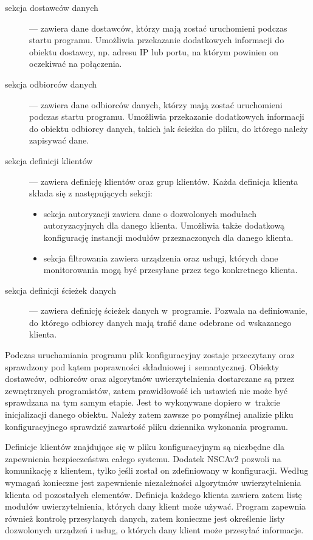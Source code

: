 \begin{description}
\item[sekcja dostawców danych] --- zawiera dane dostawców, którzy mają
  zostać uruchomieni podczas startu programu. Umożliwia przekazanie
  dodatkowych informacji do obiektu dostawcy, np. adresu IP lub portu,
  na którym powinien on oczekiwać na połączenia. 
\item[sekcja odbiorców danych] --- zawiera dane odbiorców danych, którzy
  mają zostać uruchomieni podczas startu programu. Umożliwia
  przekazanie dodatkowych informacji do obiektu odbiorcy danych,
  takich jak ścieżka do pliku, do którego należy zapisywać dane. 
\item[sekcja definicji klientów] --- zawiera definicję klientów oraz grup
  klientów. Każda definicja klienta składa się z następujących sekcji:
  \begin{itemize}
  \item sekcja autoryzacji zawiera dane o dozwolonych modułach
    autoryzacyjnych dla danego klienta. Umożliwia także dodatkową
    konfigurację instancji modułów przeznaczonych dla danego klienta.
  \item sekcja filtrowania zawiera urządzenia oraz usługi, których
    dane monitorowania mogą być przesyłane przez tego konkretnego
    klienta.
  \end{itemize}
\item[sekcja definicji ścieżek danych] --- zawiera definicję ścieżek
  danych w~programie. Pozwala na definiowanie, do którego odbiorcy
  danych mają trafić dane odebrane od wskazanego klienta.
\end{description}

Podczas uruchamiania programu plik konfiguracyjny zostaje przeczytany
oraz sprawdzony pod kątem poprawności składniowej
i~semantycznej. Obiekty dostawców, odbiorców oraz algorytmów
uwierzytelnienia dostarczane są przez zewnętrznych programistów, zatem
prawidłowość ich ustawień nie może być sprawdzana na tym samym
etapie. Jest to wykonywane dopiero w~trakcie inicjalizacji danego
obiektu. Należy zatem zawsze po pomyślnej analizie pliku
konfiguracyjnego sprawdzić zawartość pliku dziennika wykonania
programu.

Definicje klientów znajdujące się w pliku konfiguracyjnym są niezbędne
dla zapewnienia bezpieczeństwa całego systemu. Dodatek NSCAv2 pozwoli
na komunikację z klientem, tylko jeśli został on zdefiniowany w
konfiguracji. Według wymagań konieczne jest zapewnienie niezależności
algorytmów uwierzytelnienia klienta od pozostałych
elementów. Definicja każdego klienta zawiera zatem listę modułów
uwierzytelnienia, których dany klient może używać. Program zapewnia
również kontrolę przesyłanych danych, zatem konieczne jest określenie
listy dozwolonych urządzeń i usług, o których dany klient może
przesyłać informacje.

